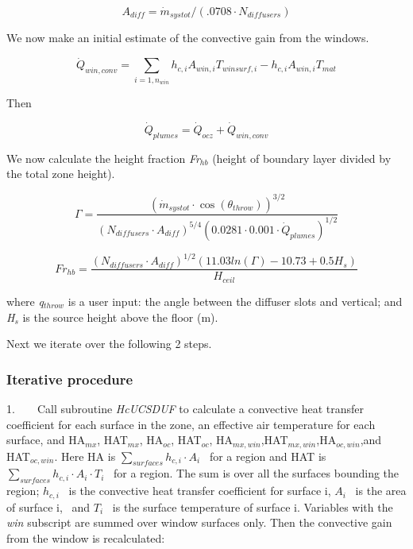 \begin{equation}
{A_{diff}} = {\dot m_{systot}}/(.0708\cdot {N_{diffusers}})
\end{equation}

We now make an initial estimate of the convective gain from the windows.

\begin{equation}
{\dot Q_{win,conv}} = \sum\limits_{i = 1,{n_{win}}} {{h_{c,i}}} {A_{win,i}}{T_{winsurf,i}} - {h_{c,i}}{A_{win,i}}{T_{mat}}
\end{equation}

Then

\begin{equation}
{\dot Q_{plumes}} = {\dot Q_{ocz}} + {\dot Q_{win,conv}}
\end{equation}

We now calculate the height fraction \emph{Fr\(_{hb}\)} (height of boundary layer divided by the total zone height).

\begin{equation}
\Gamma  = \frac{{{{({{\dot m}_{systot}}\cdot \cos ({\theta_{throw}}))}^{3/2}}}}{{{{({N_{diffusers}}\cdot {A_{diff}})}^{5/4}}{{(0.0281\cdot 0.001\cdot {{\dot Q}_{plumes}})}^{1/2}}}}
\end{equation}

\begin{equation}
F{r_{hb}} = \frac{{{{({N_{diffusers}}\cdot {A_{diff}})}^{1/2}}(11.03ln(\Gamma ) - 10.73 + 0.5{H_s})}}{{{H_{ceil}}}}
\end{equation}

where \emph{q\(_{throw}\)} is a user input: the angle between the diffuser slots and vertical; and \emph{H\(_{s}\)} is the source height above the floor (m).

Next we iterate over the following 2 steps.

\subsubsection{Iterative procedure}\label{iterative-procedure-2}

1.~~~~Call subroutine \emph{HcUCSDUF} to calculate a convective heat transfer coefficient for each surface in the zone, an effective air temperature for each surface, and HA\(_{mx}\), HAT\(_{mx}\), HA\(_{oc}\), HAT\(_{oc}\), HA\(_{mx,win}\),HAT\(_{mx,win}\),HA\(_{oc,win}\),and HAT\(_{oc,win}\). Here HA is \(\sum\limits_{surfaces} {{h_{c,i}} \cdot {A_i}}\) ~for a region and HAT is \(\sum\limits_{surfaces} {{h_{c,i}} \cdot {A_i}} \cdot {T_i}\) ~for a region. The sum is over all the surfaces bounding the region; \({h_{c,i}}\) ~is the convective heat transfer coefficient for surface i, \({A_i}\) ~is the area of surface i,~ and \({T_i}\) ~is the surface temperature of surface i. Variables with the \emph{win} subscript are summed over window surfaces only. Then the convective gain from the window is recalculated:

